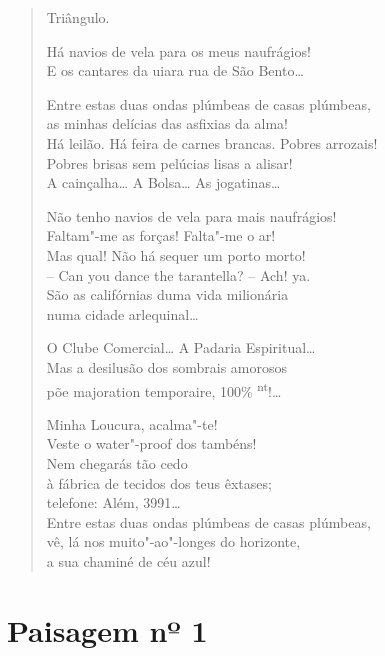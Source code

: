 \begin{verse}
Triângulo.

Há navios de vela para os meus naufrágios!\\
E os cantares da uiara rua de São Bento\ldots{}

Entre estas duas ondas plúmbeas de casas plúmbeas,\\
as minhas delícias das asfixias da alma!\\
Há leilão. Há feira de carnes brancas. Pobres arrozais!\\
Pobres brisas sem pelúcias lisas a alisar!\\
A cainçalha\ldots{} A Bolsa\ldots{} As jogatinas\ldots{}

Não tenho navios de vela para mais naufrágios!\\
Faltam"-me as forças! Falta"-me o ar!\\
Mas qual! Não há sequer um porto morto!\\
-- Can you dance the tarantella? -- Ach! ya.\\
São as califórnias duma vida milionária\\
numa cidade arlequinal\ldots{}

O Clube Comercial\ldots{} A Padaria Espiritual\ldots{}\\
Mas a desilusão dos sombrais amorosos\\
põe majoration temporaire, 100\% \textsuperscript{nt}!\ldots{}

Minha Loucura, acalma"-te!\\
Veste o water"-proof dos tambéns!\\
Nem chegarás tão cedo\\
à fábrica de tecidos dos teus êxtases;\\
telefone: Além, 3991\ldots{}\\
Entre estas duas ondas plúmbeas de casas plúmbeas,\\
vê, lá nos muito"-ao"-longes do horizonte,\\
a sua chaminé de céu azul!
\end{verse}

\chapter{Paisagem nº 1}

